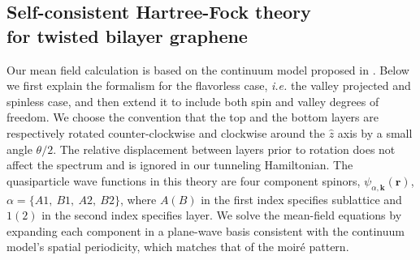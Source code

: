 \documentclass[aps,prl,reprint,amssymb,groupedaddress,twocolumn]{revtex4}
\begin{document}
\subsection{Self-consistent Hartree-Fock theory \\ for twisted bilayer graphene}
Our mean field calculation is based on the continuum model proposed in \cite{BMModel}.
Below we first explain the formalism for the flavorless case, {\it i.e.} the valley projected and spinless case,
and then extend it to include both spin and valley degrees of freedom.
We choose the convention that the top and the bottom layers are respectively rotated counter-clockwise and 
clockwise around the $\hat{z}$ axis by a small angle $\theta/2$.
The relative displacement between layers prior to rotation does not affect the spectrum and is ignored in our tunneling 
Hamiltonian.  The quasiparticle wave functions in this theory are four component spinors, 
$\psi_{\alpha, \bm{k}}(\bm{r})$, $\alpha=\{A1, \ B1,\ A2,\ B2\}$, where $A(B)$ in the first index specifies sublattice 
and $1(2)$ in the second index specifies layer.  
We solve the mean-field equations by expanding each component in a plane-wave 
basis consistent with the continuum model's spatial periodicity, which matches that of the moir\'e pattern.  
\end{document}
